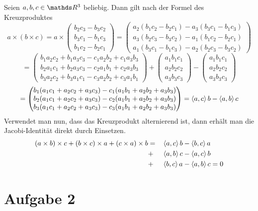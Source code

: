 		Seien $a,b,c\in\SR^3$ beliebig.
		Dann gilt nach der Formel des Kreuzproduktes
		\[
			a\times(b\times c) =
			a \times
			\begin{pmatrix}
				b_2c_3 - b_3c_2 \\
				b_3c_1 - b_1c_3 \\
				b_1c_2 - b_2c_1
			\end{pmatrix}
			=
			\begin{pmatrix}
				a_2(b_1c_2 - b_2c_1) - a_3(b_3c_1 - b_1c_3) \\
				a_3(b_2c_3 - b_3c_2) - a_1(b_1c_2 - b_2c_1) \\
				a_1(b_3c_1 - b_1c_3) - a_2(b_2c_3 - b_3c_2)
			\end{pmatrix}
		\]
		\[
			=
			\begin{pmatrix}
				b_1a_2c_2 + b_1a_3c_3 - c_1a_2b_2 + c_1a_3b_3 \\
				b_2a_1c_1 + b_2a_3c_3 - c_2a_1b_1 + c_2a_3b_3 \\
				b_3a_2c_2 + b_3a_1c_1 - c_3a_2b_2 + c_3a_1b_1
			\end{pmatrix}
			+
			\begin{pmatrix}
				a_1b_1c_1 \\
				a_2b_2c_2 \\
				a_3b_3c_3
			\end{pmatrix}
			-
			\begin{pmatrix}
				a_1b_1c_1 \\
				a_2b_2c_2 \\
				a_3b_3c_3
			\end{pmatrix}
		\]
		\[
			=
			\begin{pmatrix}
				b_1(a_1c_1 + a_2c_2 + a_3c_3) - c_1(a_1b_1 + a_2b_2 + a_3b_3) \\
				b_2(a_1c_1 + a_2c_2 + a_3c_3) - c_2(a_1b_1 + a_2b_2 + a_3b_3) \\
				b_3(a_1c_1 + a_2c_2 + a_3c_3) - c_3(a_1b_1 + a_2b_2 + a_3b_3)
			\end{pmatrix}
			=
			\left\langle a,c \right\rangle b - \left\langle a,b \right\rangle c
		\]
		Verwendet man nun, dass das Kreuzprodukt alternierend ist, dann erhält man die Jacobi-Identität direkt durch Einsetzen.
		\begin{alignat*}{3}
			(a\times b)\times c + (b\times c)\times a + (c\times a)\times b &= &&\left\langle a,c \right\rangle b - \left\langle b,c \right\rangle a \\
			&+ &&\left\langle a,b \right\rangle c - \left\langle a,c \right\rangle b \\
			&+ &&\left\langle b,c \right\rangle a - \left\langle a,b \right\rangle c = 0
		\end{alignat*}
		\qedbox


	\section*{Aufgabe 2} %
	\label{sec:aufgabe_2}
	
		


